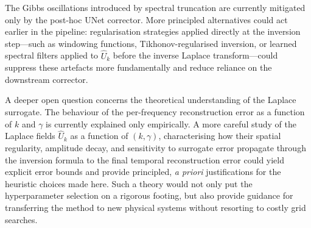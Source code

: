 \documentclass[a4paper, twocolumn]{article}
\begin{document}
The Gibbs oscillations introduced by spectral truncation are currently mitigated only by the post-hoc UNet corrector. More principled alternatives could act earlier in the pipeline: regularisation strategies applied directly at the inversion step—such as windowing functions, Tikhonov-regularised inversion, or learned spectral filters applied to $\hat{U}_k$ before the inverse Laplace transform—could suppress these artefacts more fundamentally and reduce reliance on the downstream corrector.

A deeper open question concerns the theoretical understanding of the Laplace surrogate. The behaviour of the per-frequency reconstruction error as a function of $k$ and $\gamma$ is currently explained only empirically. A more careful study of the Laplace fields $\hat{U}_k$ as a function of $(k, \gamma)$, characterising how their spatial regularity, amplitude decay, and sensitivity to surrogate error propagate through the inversion formula to the final temporal reconstruction error could yield explicit error bounds and provide principled, \textit{a priori} justifications for the heuristic choices made here. Such a theory would not only put the hyperparameter selection on a rigorous footing, but also provide guidance for transferring the method to new physical systems without resorting to costly grid searches.


\end{document}
